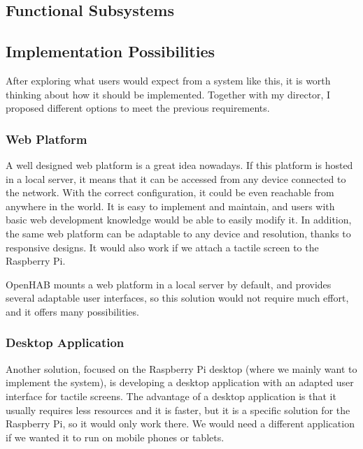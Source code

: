 
\subsection{Functional Subsystems}

\subsection{Implementation Possibilities}
After exploring what users would expect from a system like this, it is worth thinking about how it should be implemented. Together 
with my director, I proposed different options to meet the previous requirements.

\subsubsection{Web Platform}
A well designed web platform is a great idea nowadays. If this platform is hosted in a local server, it means that it can be accessed
from any device connected to the network. With the correct configuration, it could be even reachable from anywhere in the world.
It is easy to implement and maintain, and users with basic web development knowledge would be able to easily modify it. In addition,
the same web platform can be adaptable to any device and resolution, thanks to responsive designs. It would also work if we attach
a tactile screen to the Raspberry Pi.

OpenHAB mounts a web platform in a local server by default, and provides several adaptable user interfaces, so this solution would
not require much effort, and it offers many possibilities.

\subsubsection{Desktop Application}
Another solution, focused on the Raspberry Pi desktop (where we mainly want to implement the system), is developing a desktop 
application with an adapted user interface for tactile screens. The advantage of a desktop application is that it usually requires 
less resources and it is faster, but it is a specific solution for the Raspberry Pi, so it would only work there. We would need a 
different application if we wanted it to run on mobile phones or tablets.

